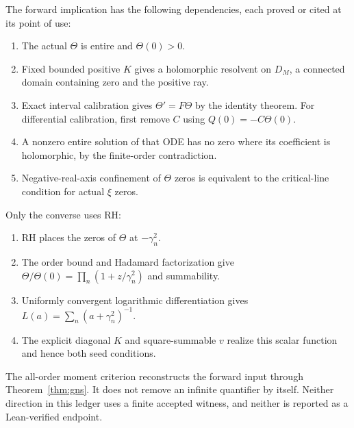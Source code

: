 \documentclass[11pt,a4paper]{article}
\numberwithin{equation}{section}
\theoremstyle{definition}
\theoremstyle{remark}
\begin{document}
The forward implication has the following dependencies, each proved
or cited at its point of use:
\begin{enumerate}[label=\textbf{F\arabic*.},leftmargin=2.8em]
\item The actual $\Theta$ is entire and $\Theta(0)>0$.
\item Fixed bounded positive $K$ gives a holomorphic resolvent on
      $D_M$, a connected domain containing zero and the positive ray.
\item Exact interval calibration gives $\Theta'=F\Theta$ by the
      identity theorem. For differential calibration, first remove
      $C$ using $Q(0)=-C\Theta(0)$.
\item A nonzero entire solution of that ODE has no zero where its
      coefficient is holomorphic, by the finite-order contradiction.
\item Negative-real-axis confinement of $\Theta$ zeros is equivalent
      to the critical-line condition for actual $\xi$ zeros.
\end{enumerate}
Only the converse uses RH:
\begin{enumerate}[label=\textbf{R\arabic*.},leftmargin=2.8em]
\item RH places the zeros of $\Theta$ at $-\gamma_n^2$.
\item The order bound and Hadamard factorization give
      $\Theta/\Theta(0)=\prod_n(1+z/\gamma_n^2)$ and summability.
\item Uniformly convergent logarithmic differentiation gives
      $L(a)=\sum_n(a+\gamma_n^2)^{-1}$.
\item The explicit diagonal $K$ and square-summable $v$ realize this
      scalar function and hence both seed conditions.
\end{enumerate}
The all-order moment criterion reconstructs the forward input through
Theorem~\ref{thm:gns}. It does not remove an infinite quantifier by
itself. Neither direction in this ledger uses a finite accepted
witness, and neither is reported as a Lean-verified endpoint.
\end{document}
